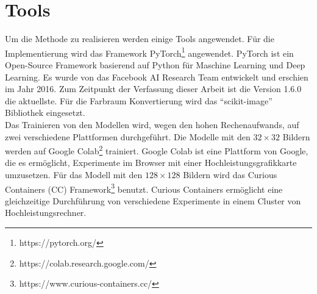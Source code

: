 \section{Tools}
Um die Methode zu realisieren werden einige Tools angewendet. Für die Implementierung wird das Framework 
PyTorch\footnote{https://pytorch.org/} angewendet. PyTorch ist ein Open-Source Framework basierend auf Python für Maschine Learning und 
Deep Learning. Es wurde von das Facebook AI Research Team entwickelt und erschien im Jahr 2016. Zum Zeitpunkt der Verfassung dieser Arbeit ist 
die Version 1.6.0 die aktuellste. Für die Farbraum Konvertierung wird das ``scikit-image'' Bibliothek eingesetzt.
\\
Das Trainieren von den Modellen wird, wegen den hohen Rechenaufwands, auf zwei verschiedene Plattformen durchgeführt. Die Modelle mit den
$32 \times 32$ Bildern werden auf Google Colab\footnote{https://colab.research.google.com/} trainiert. Google Colab ist eine Plattform von 
Google, die es ermöglicht, Experimente im Browser mit einer Hochleistungsgrafikkarte umzusetzen. Für das Modell mit den $128 \times 128$ Bildern
wird das Curious Containers (CC) Framework\footnote{https://www.curious-containers.cc/} benutzt. Curious Containers ermöglicht eine 
gleichzeitige Durchführung von verschiedene Experimente in einem Cluster von Hochleistungsrechner.



